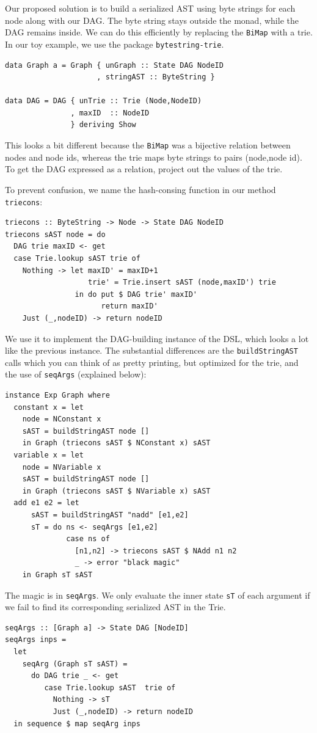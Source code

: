 \documentclass[runningheads]{llncs}
\begin{document}
Our proposed solution is to build a serialized AST using byte strings for each node along with our
DAG.
The byte string stays outside the monad, while the DAG remains inside.
We can do this efficiently by replacing the \texttt{BiMap}
with a trie.
In our toy example, we use the package \texttt{bytestring-trie}.

\begin{verbatim}
data Graph a = Graph { unGraph :: State DAG NodeID
                     , stringAST :: ByteString }

data DAG = DAG { unTrie :: Trie (Node,NodeID)
               , maxID  :: NodeID
               } deriving Show
\end{verbatim}
This looks a bit different because the \texttt{BiMap}
was a bijective relation between nodes and node ids,
whereas the trie maps byte strings to pairs (node,node id).
To get the DAG expressed as a relation, project out the values of the trie.

To prevent confusion, we name the hash-consing function in our method \texttt{triecons}:
\begin{verbatim}
triecons :: ByteString -> Node -> State DAG NodeID
triecons sAST node = do
  DAG trie maxID <- get
  case Trie.lookup sAST trie of
    Nothing -> let maxID' = maxID+1
                   trie' = Trie.insert sAST (node,maxID') trie
                in do put $ DAG trie' maxID'
                      return maxID'
    Just (_,nodeID) -> return nodeID
\end{verbatim}
We use it to implement the DAG-building instance of the DSL,
which looks a lot like the previous instance.
The substantial differences are the 
\texttt{buildStringAST} calls
which you can think of as pretty printing, but optimized for the trie,
and the use of \texttt{seqArgs} (explained below):
\begin{verbatim}
instance Exp Graph where
  constant x = let
    node = NConstant x
    sAST = buildStringAST node []
    in Graph (triecons sAST $ NConstant x) sAST
  variable x = let
    node = NVariable x
    sAST = buildStringAST node []
    in Graph (triecons sAST $ NVariable x) sAST
  add e1 e2 = let
      sAST = buildStringAST "nadd" [e1,e2]
      sT = do ns <- seqArgs [e1,e2]
              case ns of
                [n1,n2] -> triecons sAST $ NAdd n1 n2
                _ -> error "black magic"
    in Graph sT sAST
\end{verbatim}
The magic is in \texttt{seqArgs}.
We only evaluate the inner state \texttt{sT} of each argument if we
fail to find its corresponding serialized AST in the Trie.
\begin{verbatim}
seqArgs :: [Graph a] -> State DAG [NodeID]
seqArgs inps =
  let
    seqArg (Graph sT sAST) =
      do DAG trie _ <- get
         case Trie.lookup sAST  trie of
           Nothing -> sT
           Just (_,nodeID) -> return nodeID
  in sequence $ map seqArg inps
\end{verbatim}
\end{document}
